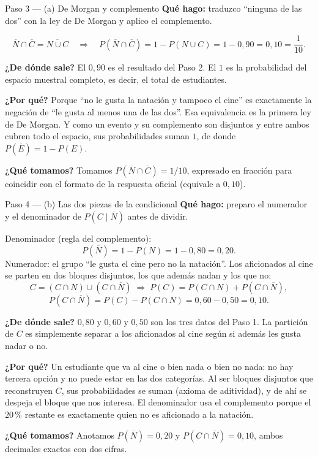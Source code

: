 \documentclass[11pt]{article}
\begin{document}
\begin{paso}{Paso 3 --- (a) De Morgan y complemento}
\textbf{Qué hago:} traduzco ``ninguna de las dos'' con la ley de De Morgan y aplico el complemento.

\[
\overline{N}\cap\overline{C}=\overline{N\cup C}
\quad\Longrightarrow\quad
P(\overline{N}\cap\overline{C})=1-P(N\cup C)=1-0{,}90=0{,}10=\frac{1}{10}.
\]

\textbf{¿De dónde sale?} El $0{,}90$ es el resultado del Paso 2. El $1$ es la probabilidad del espacio muestral completo, es decir, el total de estudiantes.

\textbf{¿Por qué?} Porque ``no le gusta la natación y tampoco el cine'' es exactamente la negación de ``le gusta al menos una de las dos''. Esa equivalencia es la primera ley de De Morgan. Y como un evento y su complemento son disjuntos y entre ambos cubren todo el espacio, sus probabilidades suman $1$, de donde $P(\overline{E})=1-P(E)$.

\textbf{¿Qué tomamos?} Tomamos $P(\overline{N}\cap\overline{C})=1/10$, expresado en fracción para coincidir con el formato de la respuesta oficial (equivale a $0{,}10$).
\end{paso}

\begin{paso}{Paso 4 --- (b) Las dos piezas de la condicional}
\textbf{Qué hago:} preparo el numerador y el denominador de $P(C\mid\overline{N})$ antes de dividir.

Denominador (regla del complemento):
\[
P(\overline{N})=1-P(N)=1-0{,}80=0{,}20.
\]
Numerador: el grupo ``le gusta el cine pero no la natación''. Los aficionados al cine se parten en dos bloques disjuntos, los que además nadan y los que no:
\[
C=(C\cap N)\cup(C\cap\overline{N})
\;\Longrightarrow\;
P(C)=P(C\cap N)+P(C\cap\overline{N}),
\]
\[
P(C\cap\overline{N})=P(C)-P(C\cap N)=0{,}60-0{,}50=0{,}10.
\]

\textbf{¿De dónde sale?} $0{,}80$ y $0{,}60$ y $0{,}50$ son los tres datos del Paso 1. La partición de $C$ es simplemente separar a los aficionados al cine según si además les gusta nadar o no.

\textbf{¿Por qué?} Un estudiante que va al cine o bien nada o bien no nada: no hay tercera opción y no puede estar en las dos categorías. Al ser bloques disjuntos que reconstruyen $C$, sus probabilidades se suman (axioma de aditividad), y de ahí se despeja el bloque que nos interesa. El denominador usa el complemento porque el $20\,\%$ restante es exactamente quien no es aficionado a la natación.

\textbf{¿Qué tomamos?} Anotamos $P(\overline{N})=0{,}20$ y $P(C\cap\overline{N})=0{,}10$, ambos decimales exactos con dos cifras.
\end{paso}
\end{document}
